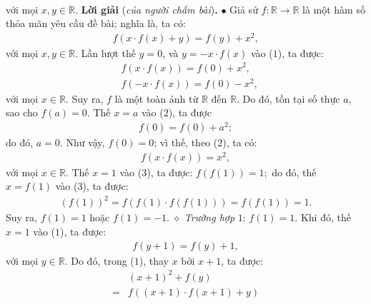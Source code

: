 \begin{multicols}{2}
\begin{align*}
	\end{align*}
	với mọi $x,y\in\mathbb R$.
	\vskip 0.05cm
	\textbf{\color{thachthuctoanhoc}Lời giải} (\textit{của người chấm bài})\textbf{\color{thachthuctoanhoc}.}
	\vskip 0.05cm
	$\bullet$ Giả sử $f: \mathbb{R} \to \mathbb{R}$ là một hàm số thỏa mãn yêu cầu đề bài; nghĩa là, ta có:
	\begin{align*}
		f\left( {x \cdot f\left( x \right) + y} \right) = f\left( y \right) + {x^2}, \tag{$1$}
	\end{align*}
	với mọi  $x,y \in \mathbb{R}$.
	\vskip 0.05cm
	Lần lượt thế $y = 0$, và $y = -x \cdot f(x)$  vào ($1$), ta được:
	\begin{align*}
		&f\left( {x \cdot f\left( x \right)} \right) = f\left( 0 \right) + {x^2}, \tag{$2$}\\
		&f\left( { - x \cdot f\left( x \right)} \right) = f\left( 0 \right) - {x^2},
	\end{align*}
	với mọi  $x \in \mathbb{R}$. Suy ra, $f$  là một toàn ánh từ $\mathbb{R}$  đến  $\mathbb{R}$. Do đó, tồn tại số thực $a$, sao cho $f(a )= 0$.
	\vskip 0.05cm 
	Thế $x = a$ vào ($2$), ta được
	\begin{align*}
		f\left( 0 \right) = f\left( 0 \right) + {a^2};
	\end{align*}
	do đó, $a = 0$. Như vậy,  $f(0) = 0$; vì thế, theo ($2$), ta có:
	\begin{align*}
		f\left( {x \cdot f\left( x \right)} \right) = {x^2}, \tag{$3$}
	\end{align*}
	với mọi  $x \in \mathbb{R}$.
	\vskip 0.05cm
	Thế $x = 1$ vào ($3$), ta được:  $f\left( {f\left( 1 \right)} \right) = 1;$ do đó, thế  $x = f(1)$ vào ($3$), ta được:
	\begin{align*}
		{\left( {f(1)} \right)^2} \!=\! f\left( {f(1) \cdot f\left( {f(1)} \right)} \right) \!=\! f\left( {f(1)} \right) \!=\! 1.
	\end{align*}
	Suy ra, $f(1) = 1$ hoặc $f(1) = -1$.
	\vskip 0.05cm  
	$\diamond$ \textit{Trường hợp} $1$: $f(1) = 1$.
	\vskip 0.05cm  
	Khi đó, thế $x = 1$ vào ($1$), ta được:
	\begin{align*}
		f\left( {y + 1} \right) = f\left( y \right) + 1,
	\end{align*}
	với mọi  $y \in \mathbb{R}$.
	\vskip 0.05cm
	Do đó, trong ($1$), thay $x$ bởi $x + 1$, ta được:
	\begin{align*}
		&{\left( {x + 1} \right)^2} + f\left( y \right) \\
		= &f\left( {\left( {x + 1} \right) \cdot f\left( {x + 1} \right) + y} \right) \\

\end{align*}
\end{multicols}
